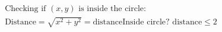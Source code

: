\documentclass[preview]{standalone}
\begin{document}
\begin{align*}
\text{Checking if } (x, y) \text{ is inside the circle:}\\ \text{Distance} = \sqrt{x^2 + y^2} = \text{distance} \text{Inside circle? } \text{distance} \leq 2
\end{align*}
\end{document}
